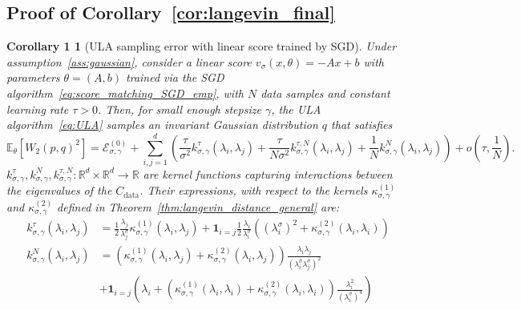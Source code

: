 \documentclass[11pt]{article}
\newcommand{\RR}{\mathbb{R}}
\begin{document}
\subsection{Proof of Corollary~\ref{cor:langevin_final}} \label{app:langevin_final}
\newtheorem*{repeatcor1}{Corollary 1}
\begin{repeatcor1}[ULA sampling error with linear score trained by SGD]
Under assumption~\ref{ass:gaussian}, consider a linear score $v_\sigma(x, \theta) = - A x + b$ with parameters \( \theta=(A,b) \) trained via the SGD algorithm~\eqref{eq:score_matching_SGD_emp}, with \( N \) data samples and constant learning rate \( \tau > 0 \). Then, for small enough stepsize $\gamma$, the ULA algorithm~\eqref{eq:ULA} samples an invariant Gaussian distribution $q$ that satisfies \vspace{-0.1cm}
\begin{equation*}
 \! \! \mathbb{E}_{\theta}\left[  W_2\left(p, q\right)^2 \right] \! =  
 \mathcal{E}^{(0)}_{\sigma, \gamma} \! +  \! \!  \sum_{i,j = 1}^d  \! \left( \! \frac{\tau}{\sigma^2} k_{\sigma, \gamma}^\tau (\lambda_i, \lambda_j)  \! +  \!\frac{\tau}{N \sigma^2} k_{\sigma, \gamma}^{\tau, N}(\lambda_i, \lambda_j)  \!+  \! \frac{1}{N} k_{\sigma, \gamma}^N(\lambda_i, \lambda_j) \! \right)  \! + \! o\left(\! \tau, \frac{1}{N} \! \right).
 \end{equation*} 
$k_{\sigma, \gamma}^\tau, k_{\sigma, \gamma}^N, k_{\sigma, \gamma}^{\tau, N} : \RR^d \times \RR^d \to \RR$ are kernel functions capturing interactions between the eigenvalues of the $C_\mathrm{data}$. Their expressions, with respect to the kernels $\kappa^{(1)}_{\sigma, \gamma}$ and $\kappa^{(2)}_{\sigma, \gamma}$ defined in Theorem~\ref{thm:langevin_distance_general} are:
\begin{align*}
k_{\sigma, \gamma}^\tau (\lambda_i, \lambda_j) &= \frac{1}{2}\frac{\lambda_j}{\lambda^\sigma_j}\kappa^{(1)}_{\sigma, \gamma}(\lambda_i, \lambda_j)+  \mathbf{1}_{i=j} \frac{1}{2}\frac{\lambda_i}{\lambda^\sigma_i}\left(\left(\lambda^\sigma_i\right)^2  + \kappa^{(2)}_{\sigma, \gamma}(\lambda_i, \lambda_i)\right) \\
k_{\sigma, \gamma}^N (\lambda_i, \lambda_j) &= \left(\kappa^{(1)}_{\sigma, \gamma}(\lambda_i, \lambda_j) + \kappa^{(2)}_{\sigma, \gamma}(\lambda_i, \lambda_j) \right) \frac{\lambda_i \lambda_j}{(\lambda^\sigma_i \lambda^\sigma_j)^2} \\
&+ \nonumber \mathbf{1}_{i=j}\left(  \lambda_i +  \left(\kappa^{(1)}_{\sigma, \gamma}(\lambda_i, \lambda_i) + \kappa^{(2)}_{\sigma, \gamma}(\lambda_i, \lambda_i) \right) \frac{\lambda_i^2}{(\lambda^\sigma_i)^4}\right)

\end{align*}
\end{repeatcor1}
\end{document}
